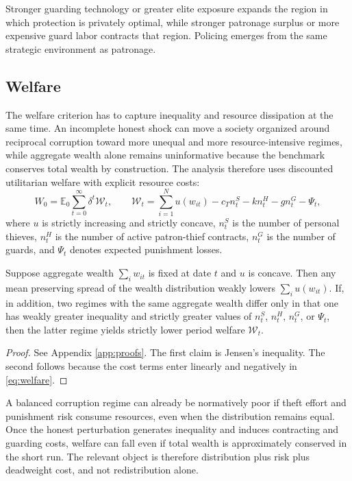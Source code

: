 Stronger guarding technology or greater elite exposure expands the region in which protection is privately optimal, while stronger patronage surplus or more expensive guard labor contracts that region. Policing emerges from the same strategic environment as patronage.

\subsection{Welfare}

The welfare criterion has to capture inequality and resource dissipation at the same time. An incomplete honest shock can move a society organized around reciprocal corruption toward more unequal and more resource-intensive regimes, while aggregate wealth alone remains uninformative because the benchmark conserves total wealth by construction. The analysis therefore uses discounted utilitarian welfare with explicit resource costs:
\begin{equation}
W_0 = \mathbb{E}_0 \sum_{t=0}^{\infty} \delta^t \mathcal{W}_t,
\qquad
\mathcal{W}_t = \sum_{i=1}^{N} u(w_{it}) - c_T n_t^{S} - k n_t^{H} - g n_t^{G} - \Psi_t,
\label{eq:welfare}
\end{equation}
where $u$ is strictly increasing and strictly concave, $n_t^{S}$ is the number of personal thieves, $n_t^{H}$ is the number of active patron-thief contracts, $n_t^{G}$ is the number of guards, and $\Psi_t$ denotes expected punishment losses.

\begin{proposition}
\label{prop:welfare}
Suppose aggregate wealth $\sum_i w_{it}$ is fixed at date $t$ and $u$ is concave. Then any mean preserving spread of the wealth distribution weakly lowers $\sum_i u(w_{it})$. If, in addition, two regimes with the same aggregate wealth differ only in that one has weakly greater inequality and strictly greater values of $n_t^{S}$, $n_t^{H}$, $n_t^{G}$, or $\Psi_t$, then the latter regime yields strictly lower period welfare $\mathcal{W}_t$.
\end{proposition}

\begin{proof}
See Appendix \ref{app:proofs}. The first claim is Jensen's inequality. The second follows because the cost terms enter linearly and negatively in \eqref{eq:welfare}.
\end{proof}

A balanced corruption regime can already be normatively poor if theft effort and punishment risk consume resources, even when the distribution remains equal. Once the honest perturbation generates inequality and induces contracting and guarding costs, welfare can fall even if total wealth is approximately conserved in the short run. The relevant object is therefore distribution plus risk plus deadweight cost, and not redistribution alone.

